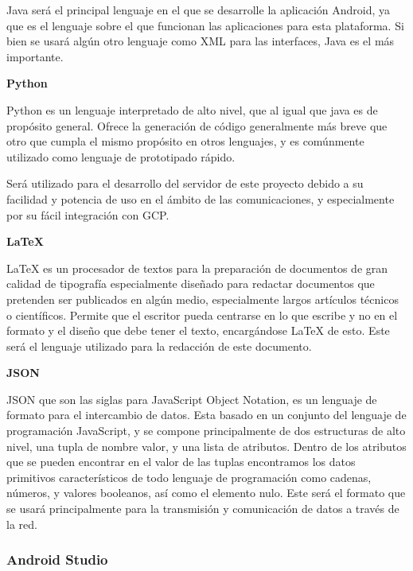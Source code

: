 Java será el principal lenguaje en el que se desarrolle la aplicación Android, ya que es el lenguaje sobre el que funcionan las aplicaciones para esta plataforma. Si bien se usará algún otro lenguaje como XML para las interfaces, Java es el más importante.

\textbf{Python}

Python es un lenguaje interpretado de alto nivel, que al igual que java es de propósito general. Ofrece la generación de código generalmente más breve que otro que cumpla el mismo propósito en otros lenguajes, y es comúnmente utilizado como lenguaje de prototipado rápido. 

Será utilizado para el desarrollo del servidor de este proyecto debido a su facilidad y potencia de uso en el ámbito de las comunicaciones, y especialmente por su fácil integración con \acf{GCP}.

\textbf{LaTeX}

LaTeX \cite{Latex} es un procesador de textos para la preparación de documentos de gran calidad de tipografía especialmente diseñado para redactar documentos que pretenden ser publicados en algún medio, especialmente largos artículos técnicos o científicos. Permite que el escritor pueda centrarse en lo que escribe y no en el formato y el diseño que debe tener el texto, encargándose LaTeX de esto. Este será el lenguaje utilizado para la redacción de este documento.

\textbf{JSON}

JSON que son las siglas para JavaScript Object Notation, es un lenguaje de formato para el intercambio de datos\cite{JSON}. Esta basado en un conjunto del lenguaje de programación JavaScript, y se compone principalmente de dos estructuras de alto nivel, una tupla de nombre valor, y una lista de atributos. Dentro de los atributos que se pueden encontrar en el valor de las tuplas encontramos los datos primitivos característicos de todo lenguaje de programación como cadenas, números, y valores booleanos, así como el elemento nulo. Este será el formato que se usará principalmente para la transmisión y comunicación de datos a través de la red.


\subsubsection{Android Studio}

